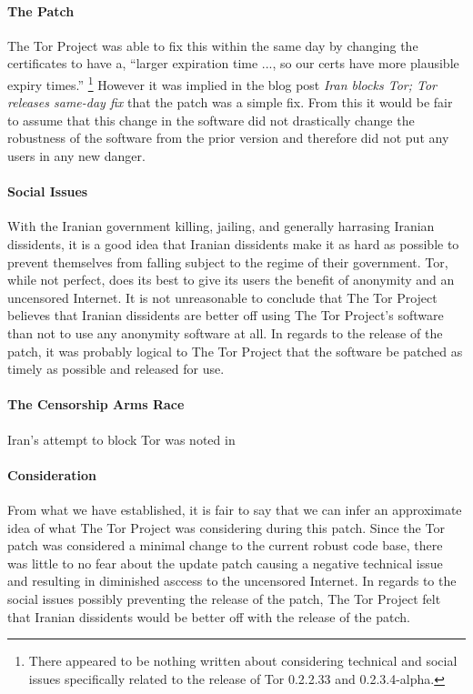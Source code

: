 \documentclass[11pt]{article}
\begin{document}
\begin{multicols}{2}
\paragraph{The Patch} 

The Tor Project was able to fix this within the same day by changing the
certificates to have a, ``larger expiration time ..., so our certs have more
plausible expiry times.'' \cite{IranBlocksTorSameDayFix} \footnote{There appeared to be
nothing written about considering technical and social issues specifically
related to the release of Tor 0.2.2.33 and 0.2.3.4-alpha.}  However it was
implied in the blog post \textit{Iran blocks Tor; Tor releases same-day fix}
that the patch was a simple fix. \cite{IranBlocksTorSameDayFix} From this it
would be fair to assume that this change in the software did not drastically
change the robustness of the software from the prior version and therefore did
not put any users in any new danger.

\paragraph{Social Issues}

With the Iranian government killing, jailing, and generally harrasing Iranian
dissidents, it is a good idea that Iranian dissidents make it as hard as
possible to prevent themselves from falling subject to the regime of their
government.  Tor, while not perfect, does its best to give its users the benefit
of anonymity and an uncensored Internet. It is not unreasonable to conclude that
The Tor Project believes that Iranian dissidents are better off using The Tor
Project's software than not to use any anonymity software at all. In regards to
the release of the patch, it was probably logical to The Tor Project that the
software be patched as timely as possible and released for use.

\paragraph{The Censorship Arms Race}

Iran's attempt to block Tor was noted in 

\paragraph{Consideration}

From what we have established, it is fair to say that we can infer an
approximate idea of what The Tor Project was considering during this patch.
Since the Tor patch was considered a minimal change to the current robust code
base, there was little to no fear about the update patch causing a negative
technical issue and resulting in diminished asccess to the uncensored Internet.
In regards to the social issues possibly preventing the release of the patch,
The Tor Project felt that Iranian dissidents would be better off with the
release of the patch.



\end{multicols}
\end{document}
